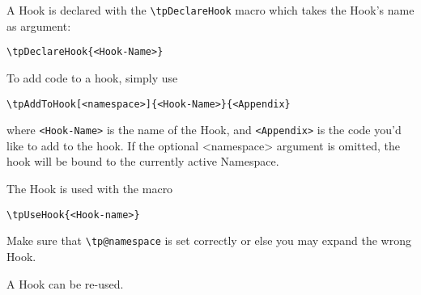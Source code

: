A Hook is declared with the \lstinline{\tpDeclareHook} macro which
takes the Hook's name as argument:
\begin{lstlisting}
\tpDeclareHook{<Hook-Name>}
\end{lstlisting}

To add code to a hook, simply use
\begin{lstlisting}[style=tex]
\tpAddToHook[<namespace>]{<Hook-Name>}{<Appendix}
\end{lstlisting}
where \lstinline{<Hook-Name>} is the name of the Hook, and
\lstinline{<Appendix>} is the code you'd like to add to the hook. If
the optional <namespace> argument is omitted, the hook will be bound
to the currently active Namespace.

The Hook is used with the macro
\begin{lstlisting}[style=tex]
\tpUseHook{<Hook-name>}
\end{lstlisting}
Make sure that \lstinline{\tp@namespace} is set correctly or else you
may expand the wrong Hook.

A Hook can be re-used.
